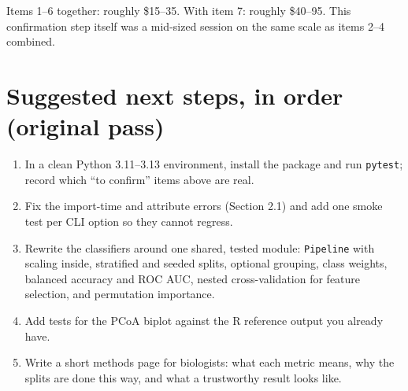 \documentclass[11pt,a4paper]{article}
\newcommand{\code}[1]{\texttt{\small #1}}
\begin{document}
Items 1--6 together: roughly \$15--35. With item 7: roughly \$40--95. This confirmation step itself was a mid-sized session
on the same scale as items 2--4 combined.

\section{Suggested next steps, in order (original pass)}

\begin{enumerate}
  \item In a clean Python 3.11--3.13 environment, install the package and run \code{pytest}; record which ``to confirm'' items
        above are real.
  \item Fix the import-time and attribute errors (Section 2.1) and add one smoke test per CLI option so they cannot regress.
  \item Rewrite the classifiers around one shared, tested module: \code{Pipeline} with scaling inside, stratified and
        seeded splits, optional grouping, class weights, balanced accuracy and ROC AUC, nested cross-validation for feature
        selection, and permutation importance.
  \item Add tests for the PCoA biplot against the R reference output you already have.
  \item Write a short methods page for biologists: what each metric means, why the splits are done this way, and what a
        trustworthy result looks like.
\end{enumerate}
\end{document}
